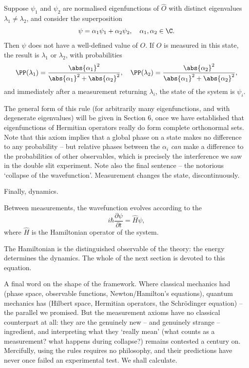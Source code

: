 \begin{axiom}
    Suppose $\psi_1$ and $\psi_2$ are normalised eigenfunctions of $\hat{O}$ with distinct eigenvalues $\lambda_1 \neq \lambda_2$, and consider the superposition
    $$
    \psi = \alpha_1 \psi_1 + \alpha_2 \psi_2, \quad \alpha_1, \alpha_2 \in \C.
    $$
    Then $\psi$ does not have a well-defined value of $O$. If $O$ is measured in this state, the result is $\lambda_1$ or $\lambda_2$, with probabilities
    $$
    \PP(\lambda_1) = \frac{\abs{\alpha_1}^2}{\abs{\alpha_1}^2 + \abs{\alpha_2}^2}, \quad \PP(\lambda_2) = \frac{\abs{\alpha_2}^2}{\abs{\alpha_1}^2 + \abs{\alpha_2}^2},
    $$
    and immediately after a measurement returning $\lambda_i$, the state of the system is $\psi_i$.
\end{axiom}

The general form of this rule (for arbitrarily many eigenfunctions, and with degenerate eigenvalues) will be given in Section 6, once we have established that eigenfunctions of Hermitian operators really do form complete orthonormal sets. Note that this axiom implies that a global phase on a state makes no difference to any probability -- but relative phases between the $\alpha_i$ \emph{can} make a difference to the probabilities of other observables, which is precisely the interference we saw in the double slit experiment. Note also the final sentence -- the notorious `collapse of the wavefunction'. Measurement changes the state, discontinuously.

Finally, dynamics.

\begin{axiom}
    Between measurements, the wavefunction evolves according to the 
    $$
    i \hbar \frac{\partial \psi}{\partial t} = \hat{H} \psi,
    $$
    where $\hat{H}$ is the Hamiltonian operator of the system.
\end{axiom}

The Hamiltonian is the distinguished observable of the theory: the energy determines the dynamics. The whole of the next section is devoted to this equation.

A final word on the shape of the framework. Where classical mechanics had (phase space, observable functions, Newton/Hamilton's equations), quantum mechanics has (Hilbert space, Hermitian operators, the Schr\"odinger equation) -- the parallel we promised. But the measurement axioms have no classical counterpart at all: they are the genuinely new -- and genuinely strange -- ingredient, and interpreting what they `really mean' (what counts as a measurement? what happens during collapse?) remains contested a century on. Mercifully, using the rules requires no philosophy, and their predictions have never once failed an experimental test. We shall calculate.

